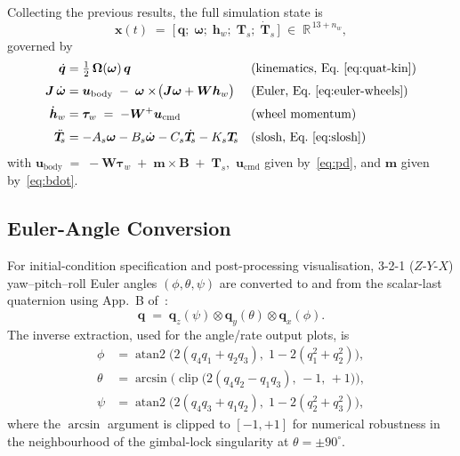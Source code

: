 Collecting the previous results, the full simulation state is
\begin{equation}
\bm{x}(t) \;=\;
\bigl[\,\bm{q};\; \bm{\omega};\; \bm{h}_w;\; \bm{T}_{\!s};\;
       \dot{\bm{T}}_{\!s}\,\bigr]
\;\in\; \mathbb{R}^{\,13+n_w},
\end{equation}
governed by
\begin{align}
\dot{\bm{q}} &= \tfrac{1}{2}\,\bm{\Omega}(\bm{\omega})\,\bm{q}
   && \text{(kinematics, Eq.~\ref{eq:quat-kin})} \\[2pt]
\bm{J}\,\dot{\bm{\omega}} &= \bm{u}_{\text{body}}
 \;-\; \bm{\omega}\times\!\bigl(\bm{J}\bm{\omega}+\bm{W}\bm{h}_w\bigr)
   && \text{(Euler, Eq.~\ref{eq:euler-wheels})} \\[2pt]
\dot{\bm{h}}_w &= \bm{\tau}_w \;=\; -\bm{W}^{+}\bm{u}_{\text{cmd}}
   && \text{(wheel momentum)} \\[2pt]
\ddot{\bm{T}}_{\!s} &=
   -A_s\bm{\omega} - B_s\dot{\bm{\omega}}
   - C_s\dot{\bm{T}}_{\!s} - K_s\bm{T}_{\!s}
   && \text{(slosh, Eq.~\ref{eq:slosh})}
\end{align}
with
\(
\bm{u}_{\text{body}} \;=\;
-\bm{W}\bm{\tau}_w \;+\; \bm{m}\times\bm{B} \;+\; \bm{T}_{\!s},
\)
$\bm{u}_{\text{cmd}}$ given by~\eqref{eq:pd}, and $\bm{m}$
given by~\eqref{eq:bdot}.


\subsection{Euler-Angle Conversion}
\label{sec:euler-conv}

For initial-condition specification and post-processing visualisation,
3-2-1 ($Z$-$Y$-$X$) yaw--pitch--roll Euler angles $(\phi,\theta,\psi)$
are converted to and from the scalar-last quaternion using
App.~B of~\cite{markley2014}:
\begin{equation}
\bm{q} \;=\; \bm{q}_z(\psi)\otimes\bm{q}_y(\theta)\otimes\bm{q}_x(\phi).
\end{equation}
The inverse extraction, used for the angle/rate output plots, is
\begin{align}
\phi   &= \operatorname{atan2}\!\bigl(2(q_4 q_1 + q_2 q_3),\;
                                      1 - 2(q_1^{2} + q_2^{2})\bigr), \\[2pt]
\theta &= \arcsin\!\bigl(\operatorname{clip}\bigl(2(q_4 q_2 - q_1 q_3),\,
                                                  -1,\,+1\bigr)\bigr), \\[2pt]
\psi   &= \operatorname{atan2}\!\bigl(2(q_4 q_3 + q_1 q_2),\;
                                      1 - 2(q_2^{2} + q_3^{2})\bigr),
\end{align}
where the $\arcsin$ argument is clipped to $[-1,+1]$ for numerical
robustness in the neighbourhood of the gimbal-lock singularity at
$\theta = \pm 90^\circ$.


